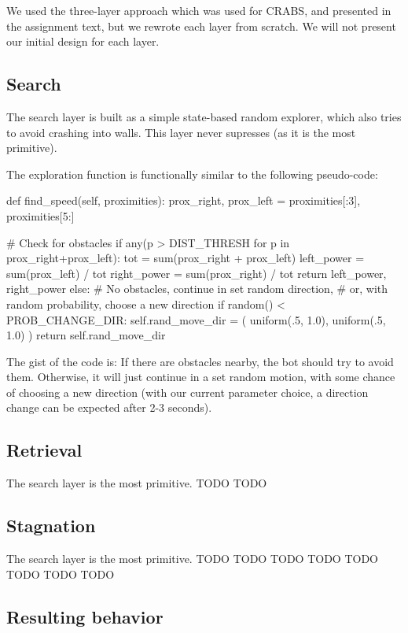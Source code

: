 \documentclass[a4paper,10pt]{article}
\begin{document}
We used the three-layer approach which was used for CRABS, and presented in
the assignment text, but we rewrote each layer from scratch. 
We will not present our initial design for each layer.

\subsection{Search}
The search layer is built as a simple state-based random explorer, which also
tries to avoid crashing into walls.  This layer never supresses (as it is the
most primitive). 

The exploration function is functionally similar to the following pseudo-code:

\begin{python}
def find_speed(self, proximities):
    prox_right, prox_left = proximities[:3], proximities[5:]

    # Check for obstacles
    if any(p > DIST_THRESH for p in prox_right+prox_left):
        tot         = sum(prox_right + prox_left)
        left_power  = sum(prox_left)  / tot
        right_power = sum(prox_right) / tot
        return left_power, right_power
    else:
        # No obstacles, continue in set random direction,
        # or, with random probability, choose a new direction
        if random() < PROB_CHANGE_DIR:
            self.rand_move_dir = (
                uniform(.5, 1.0), 
                uniform(.5, 1.0)
            )
        return self.rand_move_dir
\end{python}

The gist of the code is: If there are obstacles nearby, the bot should try
to avoid them. Otherwise, it will just continue in a set random motion, with
some chance of choosing a new direction (with our current parameter choice, a
direction change can be expected after 2-3 seconds). 

\subsection{Retrieval}
The search layer is the most primitive.
TODO TODO

\subsection{Stagnation}
The search layer is the most primitive.
TODO TODO
TODO TODO
TODO TODO
TODO TODO


\subsection{Resulting behavior}
\end{document}
